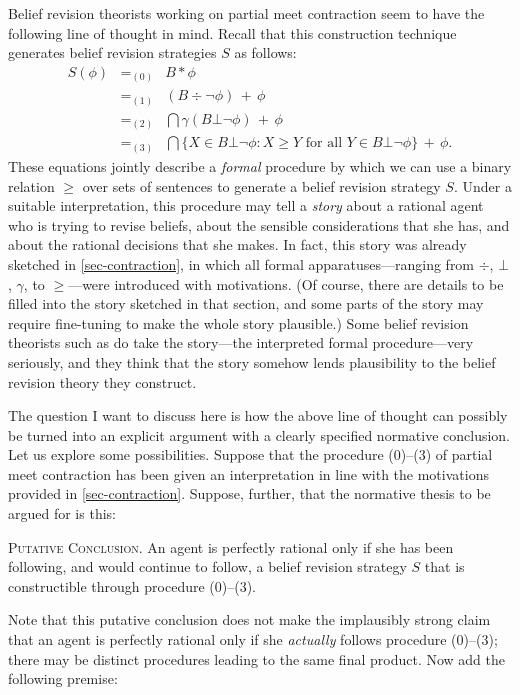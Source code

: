 Belief revision theorists working on partial meet contraction seem to have the following line of thought in mind. Recall that this construction technique generates belief revision strategies $S$ as follows: 
	\begin{eqnarray*}
	S(\phi) &=_{(0)}& B * \phi \\
			&=_{(1)}& (B \div  \neg\phi) \,+\, \phi \\
			&=_{(2)}& \bigcap \gamma(B \bot \neg\phi) \,+\, \phi \\
			&=_{(3)}& \bigcap \{ X \in B\bot\neg\phi : X \ge Y \mbox{ for all } Y \in B\bot\neg\phi \} \,+\, \phi.
	\end{eqnarray*}
These equations jointly describe a {\em formal} procedure by which we can use a binary relation $\ge$ over sets of sentences to generate a belief revision strategy $S$. Under a suitable interpretation, this procedure may tell a {\em story} about a rational agent who is trying to revise beliefs, about the sensible considerations that she has, and about the rational decisions that she makes. In fact, this story was already sketched in \autoref{sec-contraction}, in which all formal apparatuses---ranging from $\div$, $\bot$, $\gamma$, to $\ge$---were introduced with motivations. (Of course, there are details to be filled into the story sketched in that section, and some parts of the story may require fine-tuning to make the whole story plausible.) Some belief revision theorists such as \citet{gardenfors1984epistemic} do take the story---the interpreted formal procedure---very seriously, and they think that the story somehow lends plausibility to the belief revision theory they construct. 

The question I want to discuss here is how the above line of thought can possibly be turned into an explicit argument with a clearly specified normative conclusion. Let us explore some possibilities. Suppose that the procedure ($0$)--($3$) of partial meet contraction has been given an interpretation in line with the motivations provided in \autoref{sec-contraction}. Suppose, further, that the normative thesis to be argued for is this: \op

	\xm \textsc{Putative Conclusion.} An agent is perfectly rational only if she has been following, and would continue to follow, a belief revision strategy $S$ that is constructible through procedure ($0$)--($3$).

\ed Note that this putative conclusion does not make the implausibly strong claim that an agent is perfectly rational only if she {\em actually} follows procedure ($0$)--($3$); there may be distinct procedures leading to the same final product. Now add the following premise: \op

